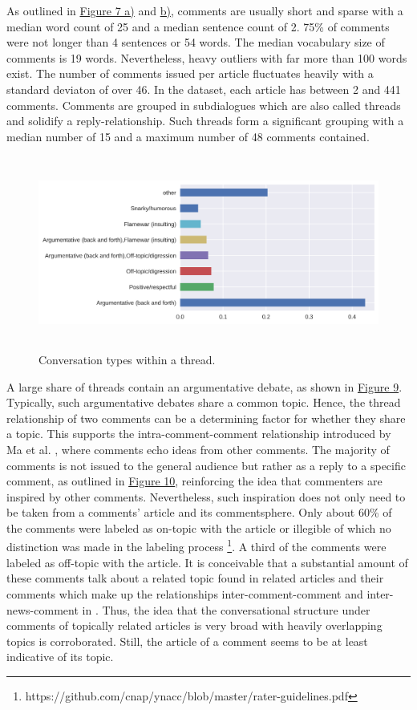 As outlined in \hyperref[fig4]{Figure 7 a)} and \hyperref[fig5]{b)}, comments are usually short and sparse with a median word count of 25 and a median sentence count of 2. 75\% of comments were not longer than 4 sentences or 54 words. The median vocabulary size of comments is 19 words. Nevertheless, heavy outliers with far more than 100 words exist. The number of comments issued per article fluctuates heavily with a standard deviaton of over 46. In the dataset, each article has between 2 and 441 comments. Comments are grouped in subdialogues which are also called threads and solidify a reply-relationship. Such threads form a significant grouping with a median number of 15 and a maximum number of 48 comments contained.
\begin{figure}[h]%
\centering
\label{fig10}%
\includegraphics[height=2.5in]{img/convo_type.png}%
\caption{Conversation types within a thread.}%
\end{figure}
A large share of threads contain an argumentative debate, as shown in \hyperref[fig10]{Figure 9}. Typically, such argumentative debates share a common topic. Hence, the thread relationship of two comments can be a determining factor for whether they share a topic. This supports the intra-comment-comment relationship introduced by Ma et al. \cite{DBLP:conf/cikm/MaSYC12}, where comments echo ideas from other comments. The majority of comments is not issued to the general audience but rather as a reply to a specific comment, as outlined in \hyperref[fig9]{Figure 10}, reinforcing the idea that commenters are inspired by other comments.
Nevertheless, such inspiration does not only need to be taken from a comments' article and its commentsphere. Only about 60\% of the comments were labeled as on-topic with the article or illegible of which no distinction was made in the labeling process \footnote{https://github.com/cnap/ynacc/blob/master/rater-guidelines.pdf}. A third of the comments were labeled as off-topic with the article. It is conceivable that a substantial amount of these comments talk about a related topic found in related articles and their comments which make up the relationships inter-comment-comment and inter-news-comment in \cite{DBLP:conf/cikm/MaSYC12}.
Thus, the idea that the conversational structure under comments of topically related articles is very broad with heavily overlapping topics is corroborated. Still, the article of a comment seems to be at least indicative of its topic.

